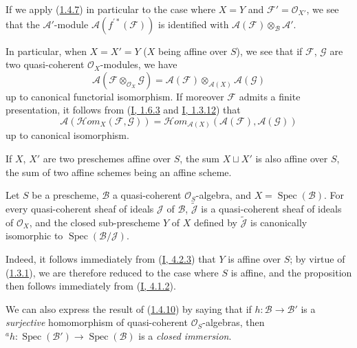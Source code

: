 If we apply (\hyperref[II.1.4.7]{1.4.7}) in particular to the case where
$X=Y$ and $\mathcal{F}'=\mathcal{O}_{X'}$, we see that the
$\mathcal{A}'$-module $\mathcal{A}(f^{\prime*}(\mathcal{F}))$ is identified
with $\mathcal{A}(\mathcal{F})\otimes_{\mathcal{B}}\mathcal{A}'$.

\begin{env}[1.4.8]
\label{II.1.4.8}
In particular, when $X=X'=Y$ ($X$ being affine over $S$), we see
that if $\mathcal{F}$, $\mathcal{G}$ are two quasi-coherent
$\mathcal{O}_X$-modules, we have
\[
  \mathcal{A}(\mathcal{F}\otimes_{\mathcal{O}_X}\mathcal{G})
  =\mathcal{A}(\mathcal{F})\otimes_{\mathcal{A}(X)}\mathcal{A}(\mathcal{G})
  \tag{1.4.8.1}\label{II.1.4.8.1}
\]
up to canonical functorial isomorphism. If moreover $\mathcal{F}$ admits
a finite presentation, it follows from
(\hyperref[I.1.6.3]{I, 1.6.3} and
\hyperref[I.1.3.12]{I, 1.3.12}) that
\[
  \mathcal{A}(\mathcal{H}om_X(\mathcal{F},\mathcal{G}))
  =\mathcal{H}om_{\mathcal{A}(X)}
    (\mathcal{A}(\mathcal{F}),\mathcal{A}(\mathcal{G}))
  \tag{1.4.8.2}\label{II.1.4.8.2}
\]
up to canonical isomorphism.
\end{env}

\begin{remark}[1.4.9]
\label{II.1.4.9}
If $X$, $X'$ are two preschemes affine over $S$, the sum
$X\sqcup X'$ is also affine over $S$, the sum of two affine schemes
being an affine scheme.
\end{remark}

\begin{proposition}[1.4.10]
\label{II.1.4.10}
Let $S$ be a prescheme, $\mathcal{B}$ a quasi-coherent
$\mathcal{O}_S$-algebra, and $X=\operatorname{Spec}(\mathcal{B})$. For every
quasi-coherent sheaf of ideals $\mathcal{J}$ of $\mathcal{B}$,
$\widetilde{\mathcal{J}}$ is a quasi-coherent sheaf of ideals of
$\mathcal{O}_X$, and the closed sub-prescheme $Y$ of $X$ defined by
$\widetilde{\mathcal{J}}$ is canonically isomorphic to
$\operatorname{Spec}(\mathcal{B}/\mathcal{J})$.
\end{proposition}

Indeed, it follows immediately from (\hyperref[I.4.2.3]{I, 4.2.3}) that
$Y$ is affine over $S$; by virtue of
(\hyperref[II.1.3.1]{1.3.1}), we are therefore reduced to the case where
$S$ is affine, and the proposition then follows immediately from
(\hyperref[I.4.1.2]{I, 4.1.2}).

We can also express the result of
(\hyperref[II.1.4.10]{1.4.10}) by saying that if
$h:\mathcal{B}\to\mathcal{B}'$ is a \emph{surjective} homomorphism of
quasi-coherent $\mathcal{O}_S$-algebras, then
${}^a h:\operatorname{Spec}(\mathcal{B}')\to
\operatorname{Spec}(\mathcal{B})$ is a \emph{closed immersion}.

